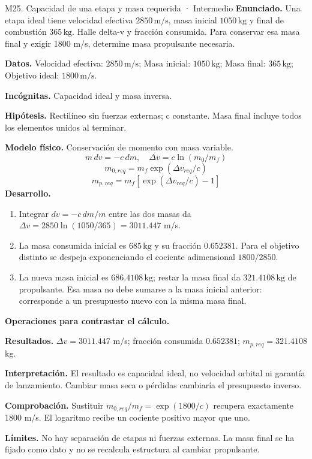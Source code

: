 \begin{studiumworked}{M25. Capacidad de una etapa y masa requerida · Intermedio}
\textbf{Enunciado.} Una etapa ideal tiene velocidad efectiva $2850\,\mathrm{m/s}$, masa inicial $1050\,\mathrm{kg}$ y final de combustión $365\,\mathrm{kg}$. Halle delta-v y fracción consumida. Para conservar esa masa final y exigir 1800 m/s, determine masa propulsante necesaria.

\textbf{Datos.} Velocidad efectiva: $2850\,\mathrm{m/s}$; Masa inicial: $1050\,\mathrm{kg}$; Masa final: $365\,\mathrm{kg}$; Objetivo ideal: $1800\,\mathrm{m/s}$.

\textbf{Incógnitas.} Capacidad ideal y masa inversa.

\textbf{Hipótesis.} Rectilíneo sin fuerzas externas; c constante. Masa final incluye todos los elementos unidos al terminar.

\textbf{Modelo físico.} Conservación de momento con masa variable.
\[m\,dv=-c\,dm,\quad \Delta v=c\ln(m_0/m_f)\]
\[m_{0,req}=m_f\exp(\Delta v_{req}/c)\]
\[m_{p,req}=m_f[\exp(\Delta v_{req}/c)-1]\]
\textbf{Desarrollo.}
\begin{enumerate}
\item Integrar $dv=-c\,dm/m$ entre las dos masas da $\Delta v=2850\ln(1050/365)=3011.447$ m/s.
\item La masa consumida inicial es $685\,\mathrm{kg}$ y su fracción $0.652381$. Para el objetivo distinto se despeja exponenciando el cociente adimensional $1800/2850$.
\item La nueva masa inicial es $686.4108\,\mathrm{kg}$; restar la masa final da $321.4108\,\mathrm{kg}$ de propulsante. Esa masa no debe sumarse a la masa inicial anterior: corresponde a un presupuesto nuevo con la misma masa final.
\end{enumerate}
\textbf{Operaciones para contrastar el cálculo.}

\textbf{Resultados.} $\Delta v=3011.447$ m/s; fracción consumida $0.652381$; $m_{p,req}=321.4108$ kg.

\textbf{Interpretación.} El resultado es capacidad ideal, no velocidad orbital ni garantía de lanzamiento. Cambiar masa seca o pérdidas cambiaría el presupuesto inverso.

\textbf{Comprobación.} Sustituir $m_{0,req}/m_f=\exp(1800/c)$ recupera exactamente 1800 m/s. El logaritmo recibe un cociente positivo mayor que uno.

\textbf{Límites.} No hay separación de etapas ni fuerzas externas. La masa final se ha fijado como dato y no se recalcula estructura al cambiar propulsante.
\end{studiumworked}

